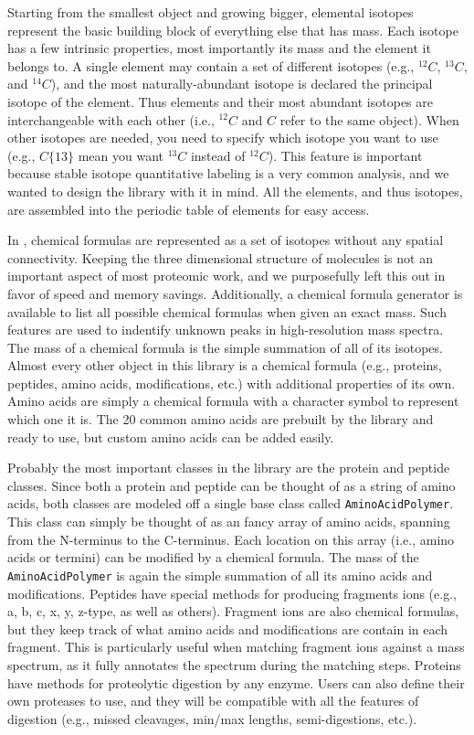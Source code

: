 Starting from the smallest object and growing bigger, elemental isotopes represent the basic building block of everything else that has mass. Each isotope has a few intrinsic properties, most importantly its mass and the element it belongs to. A single element may contain a set of different isotopes (e.g., $^{12}C$, $^{13}C$, and $^{14}C$), and the most naturally-abundant isotope is declared the principal isotope of the element. Thus elements and their most abundant isotopes are interchangeable with each other (i.e., $^{12}C$ and $C$ refer to the same object). When other isotopes are needed, you need to specify which isotope you want to use (e.g., $C\{13\}$ mean you want $^{13}C$ instead of $^{12}C$). This feature is important because stable isotope quantitative labeling is a very common analysis, and we wanted to design the library with it in mind. All the elements, and thus isotopes, are assembled into the periodic table of elements for easy access.

In \csmsl{}, chemical formulas are represented as a set of isotopes without any spatial connectivity. Keeping the three dimensional structure of molecules is not an important aspect of most proteomic work, and we purposefully left this out in favor of speed and memory savings. Additionally, a chemical formula generator is available to list all possible chemical formulas when given an exact mass. Such features are used to indentify unknown peaks in high-resolution mass spectra. The mass of a chemical formula is the simple summation of all of its isotopes. Almost every other object in this library is a chemical formula (e.g., proteins, peptides, amino acids, modifications, etc.)  with additional properties of its own. Amino acids are simply a chemical formula with a character symbol to represent which one it is. The 20 common amino acids are prebuilt by the library and ready to use, but custom amino acids can be added easily.

Probably the most important classes in the library are the protein and peptide classes. Since both a protein and peptide can be thought of as a string of amino acids, both classes are modeled off a single base class called \texttt{AminoAcidPolymer}. This class can simply be thought of as an fancy array of amino acids, spanning from the N-terminus to the C-terminus. Each location on this array (i.e., amino acids or termini) can be modified by a chemical formula. The mass of the \texttt{AminoAcidPolymer} is again the simple summation of all its amino acids and modifications. Peptides have special methods for producing fragments ions (e.g., a, b, c, x, y, z-type, as well as others). Fragment ions are also chemical formulas, but they keep track of what amino acids and modifications are contain in each fragment. This is particularly useful when matching fragment ions against a mass spectrum, as it fully annotates the spectrum during the matching steps. Proteins have methods for proteolytic digestion by any enzyme. Users can also define their own proteases to use, and they will be compatible with all the features of digestion (e.g., missed cleavages, min/max lengths, semi-digestions, etc.).

